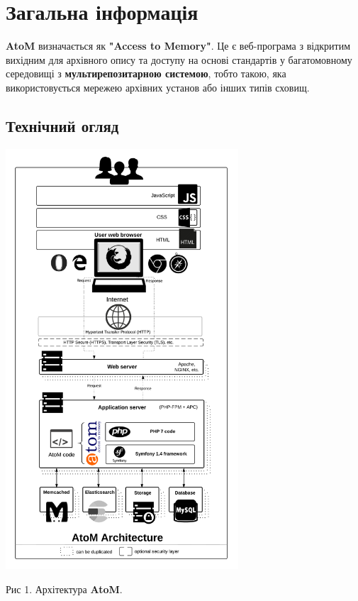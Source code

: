 \documentclass[14pt,a4paper]{article}
\begin{document}
\section{Загальна інформація}
\begin{large}
\textbf{AtoM} визначається як \textbf{"Access to Memory"}. Це є веб-програма з відкритим вихідним для архівного опису та доступу на основі стандартів у багатомовному середовищі з \textbf{мультирепозитарною системою}, тобто такою, яка використовується мережею архівних установ або інших типів сховищ.

\subsection{Технічний огляд}
    
	\begin{center}
	\includegraphics[max width=0.65\textwidth]{Images/what-is-atom.png}
	\end{center}  
	\begin{center}
	Рис 1. Архітектура \textbf{AtoM}.
	\end{center}
	

\end{large}
\end{document}
